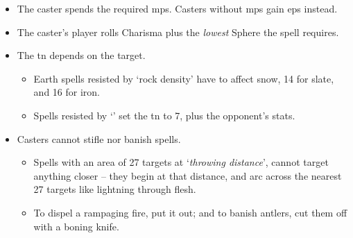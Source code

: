 \begin{itemize}
  \item
  The caster spends the required \glspl{mp}.
  Casters without \glspl{mp} gain \glspl{ep} instead.
  \item
  The caster's player rolls Charisma plus the \emph{lowest} Sphere the spell requires.
  \item
  The \gls{tn} depends on the target.
  \begin{itemize}
    \item
    Earth spells resisted by `rock density' have \tn[7] to affect snow, 14 for slate, and 16 for iron.
    \item
    Spells resisted by `' set the \gls{tn} to 7, plus the opponent's stats.
  \end{itemize}
  \item
  Casters cannot stifle nor banish spells.
  \begin{itemize}
    \item
    Spells with an area of 27 targets at `\textit{throwing distance}', cannot target anything closer -- they begin at that distance, and arc across the nearest 27 targets like lightning through flesh.
    \item
    To dispel a rampaging fire, put it out; and to banish antlers, cut them off with a boning knife.
  \end{itemize}
\end{itemize}
